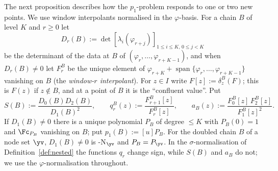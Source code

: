 The next proposition describes how the $p_1$-problem responds to one or two new points. We use window interpolants
normalised in the $\varphi$-basis. For a chain $B$ of level $K$ and $r\ge0$ let
\[
D_r(B):=\det[\lambda_i(\varphi_{r+j})]_{1\le i\le K,\,0\le j<K}
\]
be the determinant of the data at $B$ of $(\varphi_r,\dots,\varphi_{r+K-1})$, and when $D_r(B)\ne0$ let $F_r^B$ be the
unique element of $\varphi_{r+K}+\operatorname{span}\{\varphi_r,\dots,\varphi_{r+K-1}\}$ vanishing on $B$ (the
\emph{window-$r$ interpolant}). For $z\in I$ write $F[z]:=\delta^B_z(F)$; this is $F(z)$ if $z\notin B$, and at a
point of $B$ it is the ``confluent value''. Put
\[
S(B):=\frac{D_0(B)D_2(B)}{D_1(B)^2},\qquad q_r^B(z):=\frac{F_{r+1}^B[z]}{F_r^B[z]},\qquad
a_B(z):=\frac{F_0^B[z]\,F_2^B[z]}{F_1^B[z]^2}.
\]
If $D_1(B)\ne0$ there is a unique polynomial $P_B$ of degree $\le K$ with $P_B(0)=1$ and $\Fc_{P_B}$ vanishing on
$B$; put $p_1(B):=[u]P_B$. For the doubled chain $B$ of a node set $\yv$, $D_1(B)\ne0$ is \hyp{N}$_{\yv}$ and
$P_B=P_{\yv}$. In the $\sigma$-normalisation of Definition~\ref{def:nested} the functions $q_r$ change sign, while
$S(B)$ and $a_B$ do not; we use the $\varphi$-normalisation throughout.

